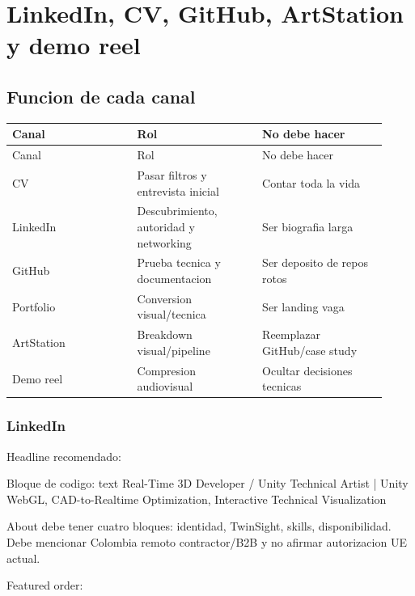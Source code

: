 \chapter{LinkedIn, CV, GitHub, ArtStation y demo reel}

\section{Funcion de cada canal}


\begin{center}
\scriptsize
\begin{longtable}{>{\raggedright\arraybackslash}p{0.305\linewidth} >{\raggedright\arraybackslash}p{0.305\linewidth} >{\raggedright\arraybackslash}p{0.305\linewidth}}
\toprule
Canal & Rol & No debe hacer \\
\midrule
\endfirsthead
\toprule
Canal & Rol & No debe hacer \\
\midrule
\endhead
CV & Pasar filtros y entrevista inicial & Contar toda la vida \\
LinkedIn & Descubrimiento, autoridad y networking & Ser biografia larga \\
GitHub & Prueba tecnica y documentacion & Ser deposito de repos rotos \\
Portfolio & Conversion visual/tecnica & Ser landing vaga \\
ArtStation & Breakdown visual/pipeline & Reemplazar GitHub/case study \\
Demo reel & Compresion audiovisual & Ocultar decisiones tecnicas \\
\bottomrule
\end{longtable}
\end{center}


\subsection{LinkedIn}


Headline recomendado:


\begin{mdcode}
Bloque de codigo: text
Real-Time 3D Developer / Unity Technical Artist | Unity WebGL, CAD-to-Realtime Optimization, Interactive Technical Visualization
\end{mdcode}


About debe tener cuatro bloques: identidad, TwinSight, skills, disponibilidad. Debe mencionar Colombia remoto contractor/B2B y no afirmar autorizacion UE actual.


Featured order:


